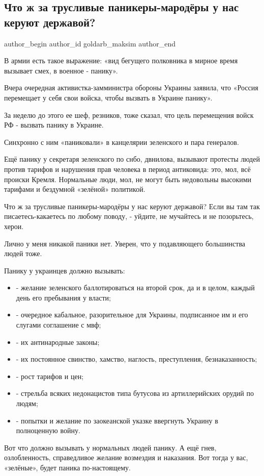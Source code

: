  
 
 
 
 
 
\subsection{Что ж за трусливые паникеры-мародёры у нас керуют державой?}
\label{sec:30_11_2021.fb.goldarb_maksim.1.panika}
 
\ifcmt
 author_begin
   author_id goldarb_maksim
 author_end
\fi

В армии есть такое выражение: «вид бегущего полковника в мирное время вызывает
смех, в военное - панику». 

Вчера очередная активистка-замминистра обороны Украины заявила, что «Россия
перемещает у себя свои войска, чтобы вызвать в Украине панику».

За неделю до этого ее шеф, резников, тоже сказал, что цель перемещения войск РФ
- вызвать панику в Украине. 

Синхронно с ним «паниковали» в канцелярии зеленского и пара генералов. 

Ещё панику у секретаря зеленского по снбо, двнилова, вызывают протесты людей
против тарифов и нарушения прав человека в период антиковида: это, мол, всё
происки Кремля. Нормальные люди, мол, не могут быть недовольны высокими
тарифами и бездумной «зелёной» политикой. 

Что ж за трусливые паникеры-мародёры у нас керуют державой? Если вы там так
писаетесь-какаетесь по любому поводу, - уйдите, не мучайтесь и не позорьтесь,
херои.

Лично у меня никакой паники нет. Уверен, что у подавляющего большинства людей
тоже. 

Панику у украинцев должно вызывать: 

\begin{itemize}
  \item - желание зеленского баллотироваться на второй срок, да и в целом, каждый день его пребывания у власти; 
  \item - очередное кабальное, разорительное для Украины,  подписанное им и его слугами соглашение с мвф; 
  \item - их антинародные законы;
  \item - их постоянное свинство, хамство, наглость, преступления, безнаказанность;
  \item - рост тарифов и цен;
  \item - стрельба всяких недонацистов типа бутусова из артиллерийских орудий по людям; 
  \item - попытки и желание по заокеанской указке ввергнуть Украину в полноценную войну. 
\end{itemize}

Вот что должно вызывать у нормальных людей панику. А ещё гнев, озлобленность,
справедливое желание возмездия и наказания. Вот тогда у вас, «зелёные», будет
паника по-настоящему.

